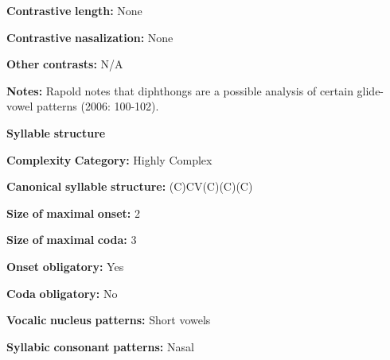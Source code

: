 \begin{styleBody}
\textbf{Contrastive} \textbf{length:} None
\end{styleBody}

\begin{styleBody}
\textbf{Contrastive} \textbf{nasalization:} None
\end{styleBody}

\begin{styleBody}
\textbf{Other} \textbf{contrasts:} N/A
\end{styleBody}

\begin{styleBody}
\textbf{Notes:} Rapold notes that diphthongs are a possible analysis of certain glide-vowel patterns (2006: 100-102).
\end{styleBody}

\begin{styleBody}
\textbf{Syllable} \textbf{structure}
\end{styleBody}

\begin{styleBody}
\textbf{Complexity} \textbf{Category:} Highly Complex
\end{styleBody}

\begin{styleBody}
\textbf{Canonical} \textbf{syllable} \textbf{structure:} (C)CV(C)(C)(C) \citep[91-112]{Rapold2006}
\end{styleBody}

\begin{styleBody}
\textbf{Size} \textbf{of} \textbf{maximal} \textbf{onset:} 2
\end{styleBody}

\begin{styleBody}
\textbf{Size} \textbf{of} \textbf{maximal} \textbf{coda:} 3
\end{styleBody}

\begin{styleBody}
\textbf{Onset} \textbf{obligatory:} Yes
\end{styleBody}

\begin{styleBody}
\textbf{Coda} \textbf{obligatory:} No
\end{styleBody}

\begin{styleBody}
\textbf{Vocalic} \textbf{nucleus} \textbf{patterns:} Short vowels
\end{styleBody}

\begin{styleBody}
\textbf{Syllabic} \textbf{consonant} \textbf{patterns:} Nasal
\end{styleBody}

